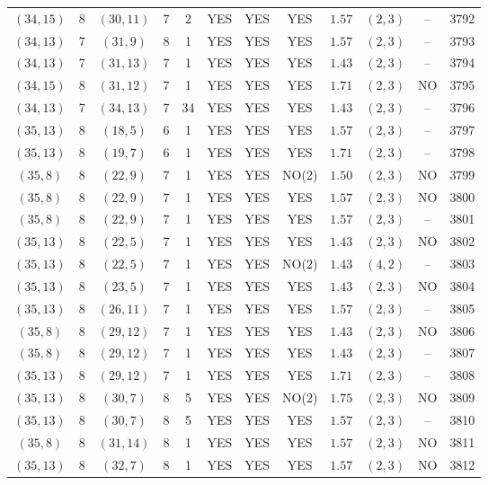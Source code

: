 \begin{longtable}{|c|c|c|c|c|c|c|c|c|c|c|c|}
$(34,15)$ & 8 & $(30,11)$ & 7 & 2 & YES & YES & YES & $1.57$ & $(2,3)$ & -- & 3792\\
$(34,13)$ & 7 & $(31,9)$ & 8 & 1 & YES & YES & YES & $1.57$ & $(2,3)$ & -- & 3793\\
$(34,13)$ & 7 & $(31,13)$ & 7 & 1 & YES & YES & YES & $1.43$ & $(2,3)$ & -- & 3794\\
$(34,15)$ & 8 & $(31,12)$ & 7 & 1 & YES & YES & YES & $1.71$ & $(2,3)$ & NO & 3795\\
$(34,13)$ & 7 & $(34,13)$ & 7 & 34 & YES & YES & YES & $1.43$ & $(2,3)$ & -- & 3796\\
$(35,13)$ & 8 & $(18,5)$ & 6 & 1 & YES & YES & YES & $1.57$ & $(2,3)$ & -- & 3797\\
$(35,13)$ & 8 & $(19,7)$ & 6 & 1 & YES & YES & YES & $1.71$ & $(2,3)$ & -- & 3798\\
$(35,8)$ & 8 & $(22,9)$ & 7 & 1 & YES & YES & NO(2) & $1.50$ & $(2,3)$ & NO & 3799\\
$(35,8)$ & 8 & $(22,9)$ & 7 & 1 & YES & YES & YES & $1.57$ & $(2,3)$ & NO & 3800\\
$(35,8)$ & 8 & $(22,9)$ & 7 & 1 & YES & YES & YES & $1.57$ & $(2,3)$ & -- & 3801\\
$(35,13)$ & 8 & $(22,5)$ & 7 & 1 & YES & YES & YES & $1.43$ & $(2,3)$ & NO & 3802\\
$(35,13)$ & 8 & $(22,5)$ & 7 & 1 & YES & YES & NO(2) & $1.43$ & $(4,2)$ & -- & 3803\\
$(35,13)$ & 8 & $(23,5)$ & 7 & 1 & YES & YES & YES & $1.43$ & $(2,3)$ & NO & 3804\\
$(35,13)$ & 8 & $(26,11)$ & 7 & 1 & YES & YES & YES & $1.57$ & $(2,3)$ & -- & 3805\\
$(35,8)$ & 8 & $(29,12)$ & 7 & 1 & YES & YES & YES & $1.43$ & $(2,3)$ & NO & 3806\\
$(35,8)$ & 8 & $(29,12)$ & 7 & 1 & YES & YES & YES & $1.43$ & $(2,3)$ & -- & 3807\\
$(35,13)$ & 8 & $(29,12)$ & 7 & 1 & YES & YES & YES & $1.71$ & $(2,3)$ & -- & 3808\\
$(35,13)$ & 8 & $(30,7)$ & 8 & 5 & YES & YES & NO(2) & $1.75$ & $(2,3)$ & NO & 3809\\
$(35,13)$ & 8 & $(30,7)$ & 8 & 5 & YES & YES & YES & $1.57$ & $(2,3)$ & -- & 3810\\
$(35,8)$ & 8 & $(31,14)$ & 8 & 1 & YES & YES & YES & $1.57$ & $(2,3)$ & NO & 3811\\
$(35,13)$ & 8 & $(32,7)$ & 8 & 1 & YES & YES & YES & $1.57$ & $(2,3)$ & NO & 3812\\

\end{longtable}
